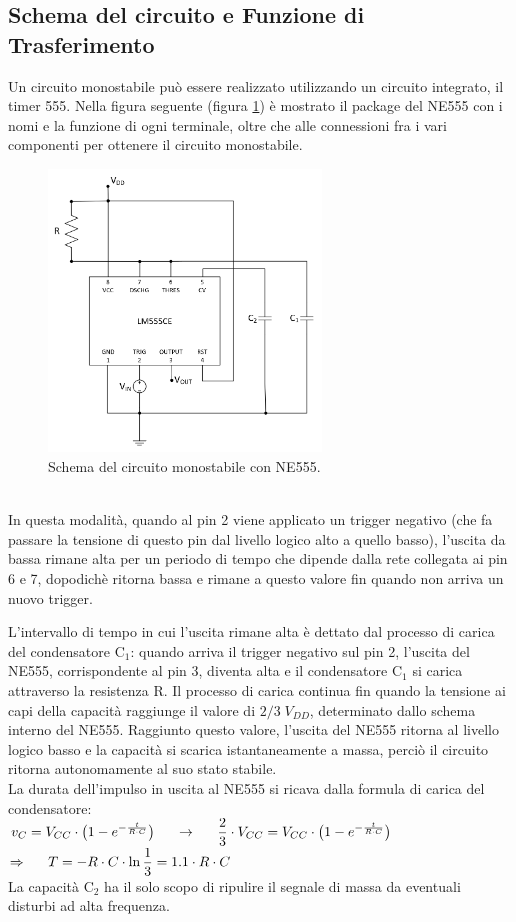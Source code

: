\documentclass{report}
\begin{document}
\subsection{Schema del circuito e Funzione di Trasferimento}
Un circuito monostabile può essere realizzato utilizzando un circuito integrato, il timer 555. Nella figura seguente (figura \ref{figura:schema2}) è mostrato il package del NE555 con i nomi e la funzione di ogni terminale, oltre che alle connessioni fra i vari componenti per ottenere il circuito monostabile.
\begin{figure}[h!]
	\centering
	\includegraphics[height=7.5cm]{immagini/schema2}
	\caption{Schema del circuito monostabile con NE555.}
	\label{figura:schema2}
\end{figure}
\\In questa modalità, quando al pin 2 viene applicato un trigger negativo (che fa passare la tensione di questo pin dal livello logico alto a quello basso), l'uscita da bassa rimane alta per un periodo di tempo che dipende dalla rete collegata ai pin 6 e 7, dopodichè ritorna bassa e rimane a questo valore fin quando non arriva un nuovo trigger.\par
L'intervallo di tempo in cui l'uscita rimane alta è dettato dal processo di carica del condensatore $\mathrm{C_1}$: quando arriva il trigger negativo sul pin 2, l'uscita del NE555, corrispondente al pin 3, diventa alta e il condensatore $\mathrm{C_1}$ si carica attraverso la resistenza $\mathrm{R}$. Il processo di carica continua fin quando la tensione ai capi della capacità raggiunge il valore di $\displaystyle{2/3\;V_{DD}}$, determinato dallo schema interno del NE555. Raggiunto questo valore, l'uscita del NE555 ritorna al livello logico basso e la capacità si scarica istantaneamente a massa, perciò il circuito ritorna autonomamente al suo stato stabile.
\\La durata dell'impulso in uscita al NE555 si ricava dalla formula di carica del condensatore: 
\\[4pt]\indent$\displaystyle{v_C=V_{CC}\cdot\bigl(1-e^{-\frac{t}{R\cdot C}}\bigr)\indent\rightarrow\indent\frac{2}{3}\cdot V_{CC}=V_{CC}\cdot\bigl(1-e^{-\frac{t}{R\cdot C}}\bigr)}$
\\[4pt]\indent$\displaystyle{\Rightarrow\indent T=-R\cdot C\cdot\ln\frac{1}{3}=1.1\cdot R\cdot C}$
\\La capacità $\mathrm{C_2}$ ha il solo scopo di ripulire il segnale di massa da eventuali disturbi ad alta frequenza.
\end{document}
